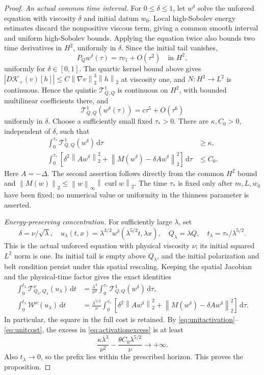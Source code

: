 \documentclass[11pt]{article}
\newcommand{\dd}{\,\mathrm d}
\newcommand{\norm}[1]{\left\lVert#1\right\rVert}
\newcommand{\curl}{\operatorname{curl}}
\begin{document}
\begin{proof}
\emph{An actual common time interval.}
For $0\leq\delta\leq1$, let $w^\delta$ solve the unforced equation
with viscosity $\delta$ and initial datum $w_0$. Local high-Sobolev
energy estimates discard the nonpositive viscous term, giving a common
smooth interval and uniform high-Sobolev bounds. Applying the equation
twice also bounds two time derivatives in $H^2$, uniformly in $\delta$.
Since the initial tail vanishes,
\[
 P_Qw^\delta(\tau)=\tau v_1+O(\tau^2)\quad\text{in }H^2,
\]
uniformly for $\delta\in[0,1]$. The quartic kernel bound above gives
$|D\mathcal K_+(v)[h]|\leq C\norm{\nabla v}_2^3\norm h_2$ at
viscosity one, and $N:H^2\to L^2$ is continuous. Hence the quintic
$\mathcal T_{Q,Q}^1$ is continuous on $H^2$, with bounded multilinear
coefficients there, and
\[
 \mathcal T_{Q,Q}^1(w^\delta(\tau))=c\tau^5+O(\tau^6)
\]
uniformly in $\delta$. Choose a sufficiently small fixed $\tau_*>0$.
There are $\kappa,C_0>0$, independent of $\delta$, such that
\begin{align}
 \int_0^{\tau_*}\mathcal T_{Q,Q}^1(w^\delta)\dd\tau
 &\geq\kappa,\label{eq:unitactivation}\\
 \int_0^{\tau_*}\left[
 \delta^2\norm{Aw^\delta}_2^2+
 \norm{M(w^\delta)-\delta Aw^\delta}_2^2\right]\dd\tau
 &\leq C_0.\label{eq:unitcost}
\end{align}
Here $A=-\Delta$. The second assertion follows directly from the common
$H^2$ bound and $\norm{M(w)}_2\leq\norm w_\infty\norm{\curl w}_2$.
The time $\tau_*$ is fixed only after $m,L,w_0$ have been fixed; no
numerical value or uniformity in the thinness parameter is asserted.

\emph{Energy-preserving concentration.}
For sufficiently large $\lambda$, set
\[
 \delta=\nu/\sqrt\lambda,\quad
 u_\lambda(t,x)=\lambda^{3/2}
    w^\delta(\lambda^{5/2}t,\lambda x),\quad
 Q_\lambda=\lambda Q,\quad t_\lambda=\tau_*/\lambda^{5/2}.
\]
This is the actual unforced equation with physical viscosity $\nu$;
its initial squared $L^2$ norm is one. Its initial tail is empty above
$Q_\lambda$, and the initial polarization and belt condition persist
under this spatial rescaling. Keeping the spatial Jacobian and the
physical-time factor gives the exact identities
\begin{align}
 \int_0^{t_\lambda}\mathcal T_{Q_\lambda,Q_\lambda}^\nu(u_\lambda)\dd t
 &=\frac{\lambda^3}{\nu^2}
      \int_0^{\tau_*}\mathcal T_{Q,Q}^1(w^\delta)\dd\tau,
       \label{eq:scaledreturn}\\
 \int_0^{t_\lambda}\mathcal W^\nu(u_\lambda)\dd t
 &=\frac{\lambda^{5/2}}\nu\int_0^{\tau_*}
       \left[\delta^2\norm{Aw^\delta}_2^2+
        \norm{M(w^\delta)-\delta Aw^\delta}_2^2\right]\dd\tau.
       \label{eq:scaledcost}
\end{align}
In particular, the square in the full cost is retained. By
\eqref{eq:unitactivation}--\eqref{eq:unitcost}, the excess in
\eqref{eq:activationexcess} is at least
\[
 \frac{\kappa\lambda^3}{\nu^2}
       -\frac{\theta C_0\lambda^{5/2}}\nu\longrightarrow+\infty.
\]
Also $t_\lambda\to0$, so the prefix lies within the prescribed horizon.
This proves the proposition.
\end{proof}
\end{document}
